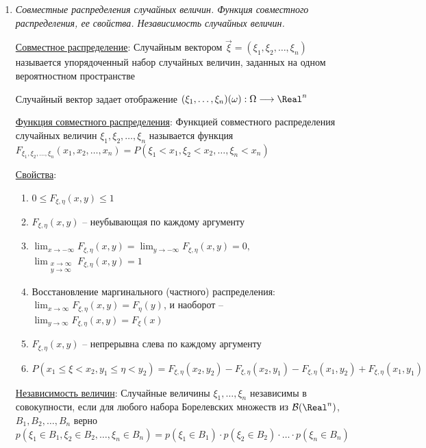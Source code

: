 \begin{enumerate}
    \hyperlink{lawofbignumberskolmogorov}{ЗБЧ Колмогорова}: В условиях теоремы Хинчина $\frac{\xi_1 + \dots + \xi_n}{n} \overset{\text{п.н.}}{\longrightarrow} E\xi_1$

    \item \textit{Совместные распределения случайных величин. Функция совместного распределения, ее свойства. Независимость случайных величин.}
    
    \hyperlink{jointdistribution}{Совместное распределение}: Случайным вектором $\vec{\xi} = (\xi_1, \xi_2, \dots, \xi_n)$ называется упорядоченный набор случайных величин, заданных
    на одном вероятностном пространстве

    Случайный вектор задает отображение $(\xi_1, \dots, \xi_n) (\omega) : \Omega \longrightarrow \Real^n$

    \hyperlink{jointdistributionfunction}{Функция совместного распределения}: Функцией совместного распределения случайных величин $\xi_1, \xi_2, \dots, \xi_n$ называется функция 
    $F_{\xi_1, \xi_2, \dots, \xi_n}(x_1, x_2, \dots, x_n) = P(\xi_1 < x_1, \xi_2 < x_2, \dots, \xi_n < x_n)$

    \hyperlink{jointdistributionfunctionproperties}{Свойства}: 

    \begin{enumerate}
        \item $0 \leq F_{\xi, \eta}(x, y) \leq 1$
        \item $F_{\xi, \eta}(x, y)$ -- неубывающая по каждому аргументу
        \item $\lim_{x \to -\infty} F_{\xi, \eta}(x, y) = \lim_{y \to -\infty} F_{\xi, \eta}(x, y) = 0, $
        $\lim_{\substack{x \to \infty \\ y \to \infty}} F_{\xi, \eta}(x, y) = 1$

        \item Восстановление маргинального (частного) распределения: 
        $\lim_{x \to \infty} F_{\xi, \eta}(x, y) = F_\eta(y)$, и наоборот -- $\lim_{y \to \infty} F_{\xi, \eta}(x, y) = F_\xi(x)$

        \item $F_{\xi, \eta}(x, y)$ -- непрерывна слева по каждому аргументу

        \item $P(x_1 \leq \xi < x_2, y_1 \leq \eta < y_2) = F_{\xi, \eta}(x_2, y_2) - F_{\xi, \eta}(x_2, y_1) - F_{\xi, \eta}(x_1, y_2) + F_{\xi, \eta}(x_1, y_1)$
    \end{enumerate}

    \hyperlink{randomvariablesindependence}{Независимость величин}: Случайные величины $\xi_1, \dots, \xi_n$ независимы в совокупности, если для любого набора Борелевских множеств из
    $\mathcal{B}(\Real^n)$, $B_1, B_2, \dots, B_n$ верно $p(\xi_1 \in B_1, \xi_2 \in B_2, \dots, \xi_n \in B_n) = p(\xi_1 \in B_1) \cdot p(\xi_2 \in B_2) \cdot \dots \cdot p(\xi_n \in B_n)$


\end{enumerate}
